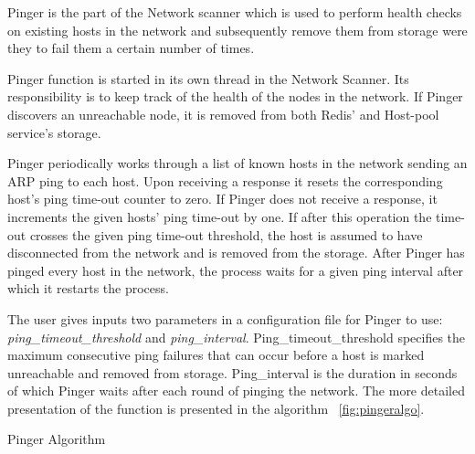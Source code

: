 Pinger is the part of the Network scanner which is used to perform health checks on existing hosts in the network and subsequently remove them from storage were they to fail them a certain number of times.

Pinger function is started in its own thread in the Network Scanner. Its responsibility is to keep track of the health of the nodes in the network. If Pinger discovers an unreachable node, it is removed from both Redis' and Host-pool service's storage.

Pinger periodically works through a list of known hosts in the network sending an ARP ping to each host. Upon receiving a response it resets the corresponding host's ping time-out counter to zero. If Pinger does not receive a response, it increments the given hosts' ping time-out by one. If after this operation the time-out crosses the given ping time-out threshold, the host is assumed to have disconnected from the network and is removed from the storage. After Pinger has pinged every host in the network, the process waits for a given ping interval after which it restarts the process.

The user gives inputs two parameters in a configuration file for Pinger to use: \textit{ping\_timeout\_threshold} and \textit{ping\_interval}. Ping\_timeout\_threshold specifies the maximum consecutive ping failures that can occur before a host is marked unreachable and removed from storage. Ping\_interval is the duration in seconds of which Pinger waits after each round of pinging the network. The more detailed presentation of the function is presented in the algorithm ~\ref{fig:pingeralgo}.

\begin{center}
\begin{algorithm}[H]
\label{fig:pingeralgo}
\begin{center}
\end{center}


\caption{Pinger Algorithm}

\end{algorithm}
\end{center}

